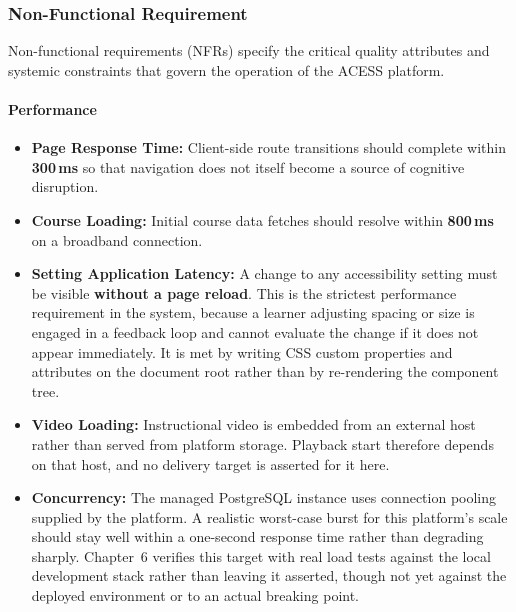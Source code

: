 \documentclass[12pt, oneside]{article} %
\newcommand{\tcode}[1]{\path{#1}}
\begin{document}
\subsubsection{Non-Functional Requirement}

Non-functional requirements (NFRs) specify the critical quality attributes and systemic constraints that govern the operation of the ACESS platform.

\paragraph{Performance}
\begin{itemize}
    \item \textbf{Page Response Time:} Client-side route transitions should complete within \textbf{300\,ms} so that navigation does not itself become a source of cognitive disruption.
    \item \textbf{Course Loading:} Initial course data fetches should resolve within \textbf{800\,ms} on a broadband connection.
    \item \textbf{Setting Application Latency:} A change to any accessibility setting must be visible \textbf{without a page reload}. This is the strictest performance requirement in the system, because a learner adjusting spacing or size is engaged in a feedback loop and cannot evaluate the change if it does not appear immediately. It is met by writing CSS custom properties and \tcode{data-*} attributes on the document root rather than by re-rendering the component tree.
    \item \textbf{Video Loading:} Instructional video is embedded from an external host rather than served from platform storage. Playback start therefore depends on that host, and no delivery target is asserted for it here.
    \item \textbf{Concurrency:} The managed PostgreSQL instance uses connection pooling supplied by the platform. A realistic worst-case burst for this platform's scale should stay well within a one-second response time rather than degrading sharply. Chapter~6 verifies this target with real load tests against the local development stack rather than leaving it asserted, though not yet against the deployed environment or to an actual breaking point.
\end{itemize}
\end{document}
